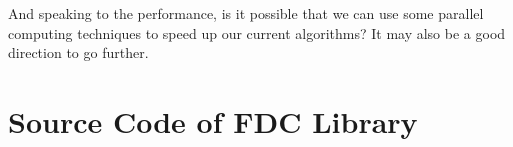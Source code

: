 \documentclass[11pt]{book}
\begin{document}
And speaking to the performance, is it possible that we can use some parallel computing techniques to speed up our current algorithms? It may also be a good direction to go further.

\renewcommand{\bibname}{References} %




\appendix

\chapter{Source Code of FDC Library}








\end{document}
